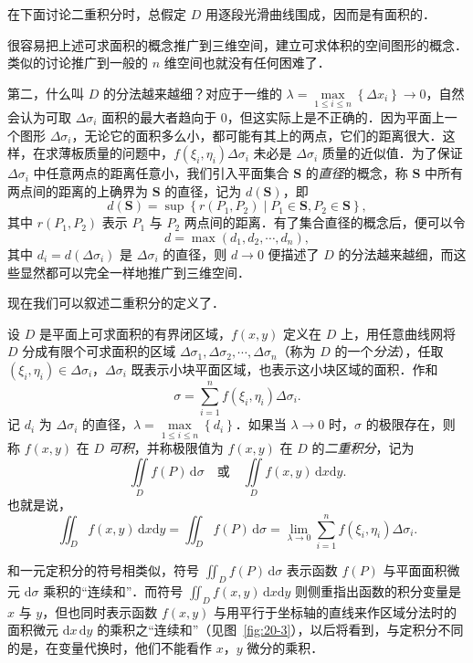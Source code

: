 在下面讨论二重积分时，总假定 $D$ 用逐段光滑曲线围成，因而是有面积的．

很容易把上述可求面积的概念推广到三维空间，建立可求体积的空间图形的概念．类似的讨论推广到一般的 $n$ 维空间也就没有任何困难了．

第二，什么叫 $D$ 的分法越来越细？对应于一维的 $\lambda=\max\limits_{1\leqslant i\leqslant n}\left\{\Delta x_{i}\right\}\to 0$，自然会认为可取 $\Delta\sigma_{i}$ 面积的最大者趋向于 $0$，但这实际上是不正确的．因为平面上一个图形 $\Delta\sigma_{i}$，无论它的面积多么小，都可能有其上的两点，它们的距离很大．这样，在求薄板质量的问题中，$f(\xi_{i},\eta_{i})\Delta\sigma_{i}$ 未必是 $\Delta\sigma_{i}$ 质量的近似值．为了保证 $\Delta\sigma_{i}$ 中任意两点的距离任意小，我们引入平面集合 $\bm{S}$ 的\emph{直径}的概念，称 $\bm{S}$ 中所有两点间的距离的上确界为 $\bm{S}$ 的直径，记为 $d(\bm{S})$，即
\[
d(\bm{S})=\sup\left\{r(P_{1},P_{2})\mid P_{1}\in\bm{S},P_{2}\in\bm{S}\right\},
\]
其中 $r(P_{1},P_{2})$ 表示 $P_{1}$ 与 $P_{2}$ 两点间的距离．有了集合直径的概念后，便可以令
\[
d=\max\left(d_{1},d_{2},\cdots,d_{n}\right),
\]
其中 $d_{i}=d(\Delta\sigma_{i})$ 是 $\Delta\sigma_{i}$ 的直径，则 $d\to 0$ 便描述了 $D$ 的分法越来越细，而这些显然都可以完全一样地推广到三维空间．

现在我们可以叙述二重积分的定义了．

\begin{definition}\label{def:20-1}
设 $D$ 是平面上可求面积的有界闭区域，$f(x,y)$ 定义在 $D$ 上，用任意曲线网将 $D$ 分成有限个可求面积的区域 $\Delta\sigma_{1},\Delta\sigma_{2},\cdots,\Delta\sigma_{n}$（称为 $D$ 的一个\emph{分法}），任取 $(\xi_{i},\eta_{i})\in\Delta\sigma_{i}$，$\Delta\sigma_{i}$ 既表示小块平面区域，也表示这小块区域的面积．作和
\[
\sigma=\sum_{i=1}^{n}f(\xi_{i},\eta_{i})\Delta\sigma_{i}.
\]
记 $d_{i}$ 为 $\Delta\sigma_{i}$ 的直径，$\lambda=\max\limits_{1\leqslant i\leqslant n}\left\{d_{i}\right\}$．如果当 $\lambda\to 0$ 时，$\sigma$ 的极限存在，则称 $f(x,y)$ 在 $D$ \emph{可积}，并称极限值为 $f(x,y)$ 在 $D$ 的\emph{二重积分}，记为
\[
\iint\limits_{D}f(P)\,\mathrm{d}\sigma\quad\text{或}\quad\iint\limits_{D}f(x,y)\,\mathrm{d}x\mathrm{d}y.
\]
也就是说，
\[
\iint_{D}f(x,y)\,\mathrm{d}x\mathrm{d}y=\iint_{D}f(P)\,\mathrm{d}\sigma=\lim_{\lambda\to 0}\sum_{i=1}^{n}f(\xi_{i},\eta_{i})\Delta\sigma_{i}.
\]
\end{definition}

和一元定积分的符号相类似，符号 $\displaystyle\iint_{D}f(P)\,\mathrm{d}\sigma$ 表示函数 $f(P)$ 与平面面积微元 $\mathrm{d}\sigma$ 乘积的``连续和''．而符号 $\displaystyle\iint_{D}f(x,y)\,\mathrm{d}x\mathrm{d}y$ 则侧重指出函数的积分变量是 $x$ 与 $y$，但也同时表示函数 $f(x,y)$ 与用平行于坐标轴的直线来作区域分法时的面积微元 $\mathrm{d}x\,\mathrm{d}y$ 的乘积之``连续和''（见图~\ref{fig:20-3}），以后将看到，与定积分不同的是，在变量代换时，他们不能看作 $x$，$y$ 微分的乘积．

